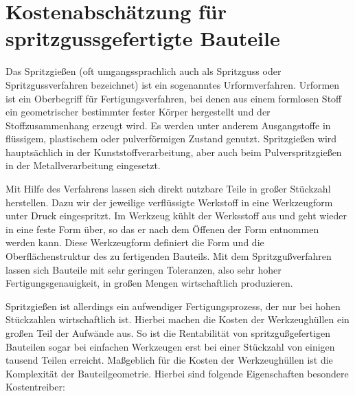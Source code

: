 \chapter{Kostenabsch\"atzung f\"ur spritzgussgefertigte Bauteile}
\label{cha:costs}
	

\vspace{1cm}
Das Spritzgie{\ss}en (oft umgangssprachlich auch als Spritzguss oder Spritzgussverfahren bezeichnet) ist ein sogenanntes Urformverfahren. Urformen ist ein Oberbegriff f\"ur Fertigungsverfahren, bei denen aus einem formlosen Stoff ein geometrischer bestimmter fester K\"orper hergestellt und der Stoffzusammenhang erzeugt wird. Es werden unter anderem Ausgangstoffe in fl\"ussigem, plastischem oder pulverförmigen Zustand genutzt. Spritzgie{\ss}en wird haupts\"achlich in der Kunststoffverarbeitung, aber auch beim Pulverspritzgie{\ss}en in der Metallverarbeitung eingesetzt.

Mit Hilfe des Verfahrens lassen sich direkt nutzbare Teile in gro{\ss}er St\"uckzahl herstellen. Dazu wir der jeweilige verfl\"ussigte  Werkstoff in eine Werkzeugform unter Druck eingespritzt. Im Werkzeug k\"uhlt der Werksstoff aus und geht wieder in eine feste Form \"uber, so das er nach dem \"Offenen der Form entnommen werden kann. Diese Werkzeugform definiert die Form und die Oberfl\"achenstruktur des zu fertigenden Bauteils. Mit dem Spritzgu{\ss}verfahren lassen sich Bauteile mit sehr geringen Toleranzen, also sehr hoher Fertigungsgenauigkeit, in gro{\ss}en Mengen wirtschaftlich produzieren. 

Spritzgie{\ss}en ist allerdings ein aufwendiger Fertigungsprozess, der nur bei hohen St\"uckzahlen wirtschaftlich ist. Hierbei machen die Kosten der Werkzeugh\"ullen ein gro{\ss}en Teil der Aufw\"ande aus. So ist die Rentabilit\"at von spritzgu{\ss}gefertigen Bauteilen sogar bei einfachen Werkzeugen erst bei einer St\"uckzahl von einigen tausend Teilen erreicht. 
Ma{\ss}geblich f\"ur die Kosten der Werkzeugh\"ullen ist die Komplexit\"at der Bauteilgeometrie. Hierbei sind folgende Eigenschaften besondere Kostentreiber: 

